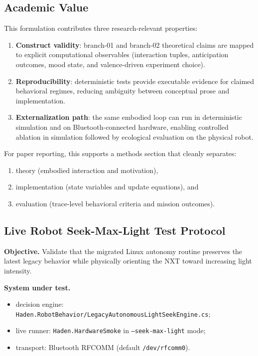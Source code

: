 \subsection{Academic Value}
This formulation contributes three research-relevant properties:
\begin{enumerate}
\item \textbf{Construct validity}: branch-01 and branch-02 theoretical claims are mapped to explicit computational observables (interaction tuples, anticipation outcomes, mood state, and valence-driven experiment choice).
\item \textbf{Reproducibility}: deterministic tests provide executable evidence for claimed behavioral regimes, reducing ambiguity between conceptual prose and implementation.
\item \textbf{Externalization path}: the same embodied loop can run in deterministic simulation and on Bluetooth-connected hardware, enabling controlled ablation in simulation followed by ecological evaluation on the physical robot.
\end{enumerate}

For paper reporting, this supports a methods section that cleanly separates:
\begin{enumerate}
\item theory (embodied interaction and motivation),
\item implementation (state variables and update equations), and
\item evaluation (trace-level behavioral criteria and mission outcomes).
\end{enumerate}

\subsection{Live Robot Seek-Max-Light Test Protocol}
\label{sec:live_seek_max_light_protocol}

\textbf{Objective.}
Validate that the migrated Linux autonomy routine preserves the latest legacy behavior while physically orienting the NXT toward increasing light intensity.

\textbf{System under test.}
\begin{itemize}
\item decision engine: \texttt{Haden.RobotBehavior/LegacyAutonomousLightSeekEngine.cs};
\item live runner: \texttt{Haden.HardwareSmoke} in \texttt{--seek-max-light} mode;
\item transport: Bluetooth RFCOMM (default \texttt{/dev/rfcomm0}).
\end{itemize}

